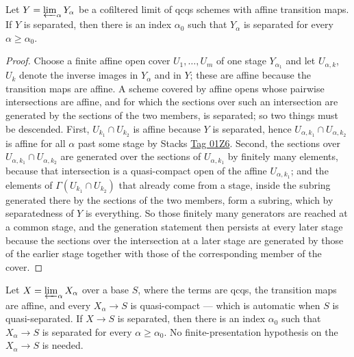 \begin{lemma}
  \label{lemma:nagata-separated-stage-exists-absolute}
  \leanok

  Let $Y=\varprojlim_\alpha Y_\alpha$ be a cofiltered limit of qcqs schemes with
  affine transition maps.  If $Y$ is separated, then there is an index
  $\alpha_0$ such that $Y_\alpha$ is separated for every $\alpha\geq\alpha_0$.
\end{lemma}

\begin{proof}
  \leanok
  Choose a finite affine open cover $U_1,\dots,U_m$ of one stage
  $Y_{\alpha_1}$ and let $U_{\alpha,k}$, $U_k$ denote the inverse images in
  $Y_\alpha$ and in $Y$; these are affine because the transition maps are
  affine.  A scheme covered by affine opens whose pairwise intersections are
  affine, and for which the sections over such an intersection are generated by
  the sections of the two members, is separated; so two things must be
  descended.
  First, $U_{k_1}\cap U_{k_2}$ is affine because $Y$ is separated, hence
  $U_{\alpha,k_1}\cap U_{\alpha,k_2}$ is affine for all $\alpha$ past some
  stage by Stacks \href{https://stacks.math.columbia.edu/tag/01Z6}{Tag 01Z6}.
  Second, the sections over $U_{\alpha,k_1}\cap U_{\alpha,k_2}$ are generated
  over the sections of $U_{\alpha,k_1}$ by finitely many elements, because that
  intersection is a quasi-compact open of the affine $U_{\alpha,k_1}$; and the
  elements of $\Gamma(U_{k_1}\cap U_{k_2})$ that already come from a stage,
  inside the subring generated there by the sections of the two members, form a
  subring, which by separatedness of $Y$ is everything.  So those finitely many
  generators are reached at a common stage, and the generation statement then
  persists at every later stage because the sections over the intersection at a
  later stage are generated by those of the earlier stage together with those of
  the corresponding member of the cover.
\end{proof}

\begin{lemma}
  \label{lemma:nagata-fixed-base-separated-stage-exists}
  \leanok

  Let $X=\varprojlim_\alpha X_\alpha$ over a base $S$, where the terms are
  qcqs, the transition maps are affine, and every $X_\alpha\to S$ is
  quasi-compact --- which is automatic when $S$ is quasi-separated.  If
  $X\to S$ is separated, then there is an index $\alpha_0$ such that
  $X_\alpha\to S$ is separated for every $\alpha\geq\alpha_0$.  No
  finite-presentation hypothesis on the $X_\alpha\to S$ is needed.
\end{lemma}

